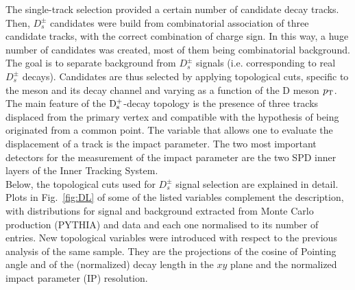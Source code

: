 The single-track selection provided a certain number of candidate
 decay tracks. Then, $D^{\pm}_s$ candidates were build from combinatorial 
 association of three candidate tracks, with the correct combination of charge 
 sign. In this way, a huge number of candidates was created, most of them 
 being combinatorial background. The goal is to separate background from
  $D^{\pm}_s$ signals (i.e. corresponding to real  $D^{\pm}_s$ decays). Candidates 
  are thus selected by applying topological cuts, specific to the meson and its 
  decay channel and varying as a function of the D meson $p_{\rm T}$.
The main feature of the ${\rm D_s^+}$-decay topology is the presence of three tracks displaced from 
the primary vertex and compatible with the hypothesis of being originated from 
a common point. 
The variable that allows one to evaluate the displacement of a track is the 
impact parameter. The two most important detectors for the measurement
 of the impact parameter are the two SPD inner layers of the Inner Tracking System. \\
Below, the topological cuts used for $D^{\pm}_s$ signal selection
 are explained in detail. Plots in Fig.~\ref{fig:DL} of some of the listed variables complement
 the description, with distributions for signal and background extracted 
 from Monte Carlo production (PYTHIA) 
  and data and each one normalised to its number of entries. 
  New topological variables were introduced with respect to the 
  previous analysis of the same sample. They are the projections of the cosine of 
 Pointing angle and of the (normalized) decay length in the $xy$ plane 
 and the normalized impact parameter (IP)
resolution.
